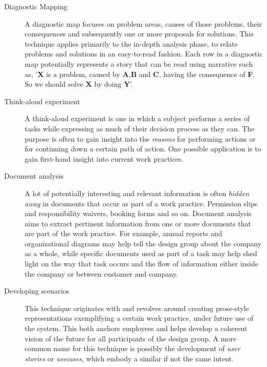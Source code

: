 \begin{description}
    \item [Diagnostic Mapping] A diagnostic map focuses on problem areas, causes
        of those problems, their consequences and subsequently one or more
        proposals for solutions. This technique applies primarily to the
        in-depth analysis phase, to relate problems and solutions in an
        easy-to-read fashion. Each row in a diagnostic map potentially
        represents a story that can be read using narrative such as, '\textbf{X}
        is a problem, caused by \textbf{A},\textbf{B} and \textbf{C}, having the
        consequence of \textbf{F}. So we should solve \textbf{X} by doing
        \textbf{Y}'. 

    \item [Think-aloud experiment] A think-aloud experiment is one in which a
        subject performs a series of tasks while expressing as much of their
        decision process as they can. The purpose is often to gain insight into
        the \textit{reasons} for performing actions or for continuing down a
        certain path of action. One possible application is to gain first-hand
        insight into current work practices.

    \item [Document analysis] A lot of potentially interesting and relevant
        information is often \textit{hidden away} in documents that occur as
        part of a work practice. Permission slips and responsibility waivers,
        booking forms and so on. Document analysis aims to extract pertinent
        information from one or more documents that are part of the work
        practice. For example, annual reports and organizational diagrams may
        help tell the design group about the company as a whole, while specific
        documents used as part of a task may help shed light on the way that
        task occurs and the flow of information either inside the company or
        between customer and company.

    \item [Developing scenarios] This technique originates with \cite{clausen1993narratives} and revolves around creating
        prose-style representations exemplifying a certain work practice, under future use of the system. This both anchors employees
        and helps develop a coherent vision of the future for all participants of the design group. A more common name for this technique
        is possibly the development of \textit{user stories} or \textit{usecases}, which embody a similar if not the same intent.


\end{description}
